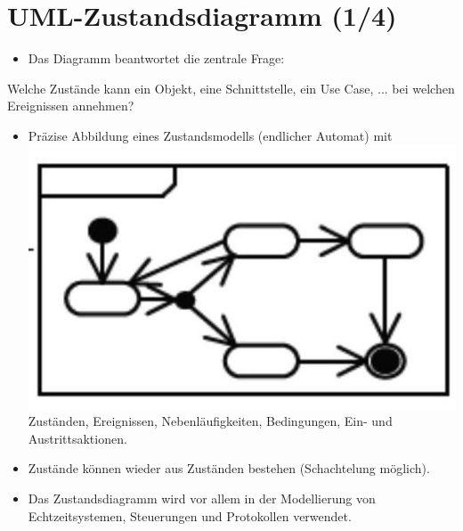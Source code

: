 \documentclass[10pt]{article}
\begin{document}
\section*{UML-Zustandsdiagramm (1/4)}
\begin{itemize}
  \item Das Diagramm beantwortet die zentrale Frage:
\end{itemize}

Welche Zustände kann ein Objekt, eine Schnittstelle, ein Use Case, ... bei welchen Ereignissen annehmen?

\begin{itemize}
  \item Präzise Abbildung eines Zustandsmodells (endlicher Automat) mit\\
\includegraphics[width=\linewidth]{images/2025_01_02_787afb9584031d2940deg-17} Zuständen, Ereignissen, Nebenläufigkeiten, Bedingungen, Ein- und Austrittsaktionen.
  \item Zustände können wieder aus Zuständen bestehen (Schachtelung möglich).
  \item Das Zustandsdiagramm wird vor allem in der Modellierung von Echtzeitsystemen, Steuerungen und Protokollen verwendet.
\end{itemize}
\end{document}
